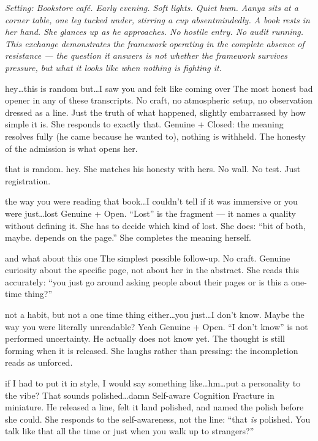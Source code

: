 
\textit{Setting: Bookstore caf\'{e}. Early evening. Soft lights. Quiet hum. Aanya sits at a corner table, one leg tucked under, stirring a cup absentmindedly. A book rests in her hand. She glances up as he approaches. No hostile entry. No audit running. This exchange demonstrates the framework operating in the complete absence of resistance --- the question it answers is not whether the framework survives pressure, but what it looks like when nothing is fighting it.}

\goldrule

{hey\ldots this is random but\ldots I saw you and felt like coming over}
{The most honest bad opener in any of these transcripts. No craft, no atmospheric setup, no observation dressed as a line. Just the truth of what happened, slightly embarrassed by how simple it is. She responds to exactly that. Genuine + Closed: the meaning resolves fully (he came because he wanted to), nothing is withheld. The honesty of the admission is what opens her.}

{that is random. hey.}
{She matches his honesty with hers. No wall. No test. Just registration.}

\thinrule

{the way you were reading that book\ldots I couldn't tell if it was immersive or you were just\ldots lost}
{Genuine + Open. ``Lost'' is the fragment --- it names a quality without defining it. She has to decide which kind of lost. She does: ``bit of both, maybe. depends on the page.'' She completes the meaning herself.}

{and what about this one}
{The simplest possible follow-up. No craft. Genuine curiosity about the specific page, not about her in the abstract. She reads this accurately: ``you just go around asking people about their pages or is this a one-time thing?''}

\thinrule

{not a habit, but not a one time thing either\ldots you just\ldots I don't know. Maybe the way you were literally unreadable? Yeah}
{Genuine + Open. ``I don't know'' is not performed uncertainty. He actually does not know yet. The thought is still forming when it is released. She laughs rather than pressing: the incompletion reads as unforced.}

{if I had to put it in style, I would say something like\ldots hm\ldots put a personality to the vibe? That sounds polished\ldots damn}
{Self-aware Cognition Fracture in miniature. He released a line, felt it land polished, and named the polish before she could. She responds to the self-awareness, not the line: ``that \textit{is} polished. You talk like that all the time or just when you walk up to strangers?''}

